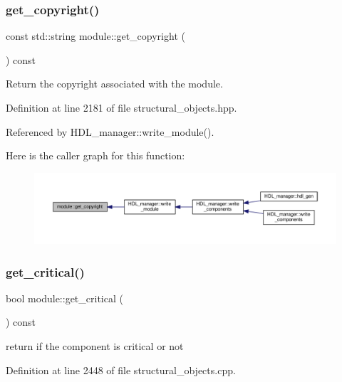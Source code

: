 \subsubsection{\texorpdfstring{get\+\_\+copyright()}{get\_copyright()}}
{\footnotesize\ttfamily const std\+::string module\+::get\+\_\+copyright (\begin{DoxyParamCaption}{ }\end{DoxyParamCaption}) const\hspace{0.3cm}{\ttfamily [inline]}}



Return the copyright associated with the module. 



Definition at line 2181 of file structural\+\_\+objects.\+hpp.



Referenced by H\+D\+L\+\_\+manager\+::write\+\_\+module().

Here is the caller graph for this function\+:
\nopagebreak
\begin{figure}[H]
\begin{center}
\leavevmode
\includegraphics[width=350pt]{d0/dd3/classmodule_a1890ad41f7972ff59dfaf374332e9ba7_icgraph}
\end{center}
\end{figure}
\mbox{\label{classmodule_a175845ff071fe38ec565e1afe19d7ba0}} 
\subsubsection{\texorpdfstring{get\+\_\+critical()}{get\_critical()}}
{\footnotesize\ttfamily bool module\+::get\+\_\+critical (\begin{DoxyParamCaption}{ }\end{DoxyParamCaption}) const}



return if the component is critical or not 



Definition at line 2448 of file structural\+\_\+objects.\+cpp.



